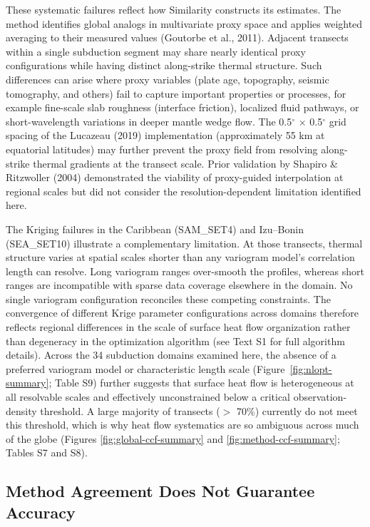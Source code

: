 \documentclass[draft,linenumbers]{agujournal2019}
\begin{document}
These systematic failures reflect how Similarity constructs its
estimates. The method identifies global analogs in multivariate proxy
space and applies weighted averaging to their measured values (Goutorbe
et al., 2011). Adjacent transects within a single subduction segment may
share nearly identical proxy configurations while having distinct
along-strike thermal structure. Such differences can arise where proxy
variables (plate age, topography, seismic tomography, and others) fail
to capture important properties or processes, for example fine-scale
slab roughness (interface friction), localized fluid pathways, or
short-wavelength variations in deeper mantle wedge flow. The
0.5\(^\circ\) \(\times\) 0.5\(^\circ\) grid spacing of the Lucazeau
(2019) implementation (approximately 55 km at equatorial latitudes) may
further prevent the proxy field from resolving along-strike thermal
gradients at the transect scale. Prior validation by Shapiro \&
Ritzwoller (2004) demonstrated the viability of proxy-guided
interpolation at regional scales but did not consider the
resolution-dependent limitation identified here.

The Kriging failures in the Caribbean (SAM\_SET4) and Izu--Bonin
(SEA\_SET10) illustrate a complementary limitation. At those transects,
thermal structure varies at spatial scales shorter than any variogram
model's correlation length can resolve. Long variogram ranges
over-smooth the profiles, whereas short ranges are incompatible with
sparse data coverage elsewhere in the domain. No single variogram
configuration reconciles these competing constraints. The convergence of
different Krige parameter configurations across domains therefore
reflects regional differences in the scale of surface heat flow
organization rather than degeneracy in the optimization algorithm (see
Text S1 for full algorithm details). Across the 34 subduction domains
examined here, the absence of a preferred variogram model or
characteristic length scale (Figure~\ref{fig:nlopt-summary}; Table S9)
further suggests that surface heat flow is heterogeneous at all
resolvable scales and effectively unconstrained below a critical
observation-density threshold. A large majority of transects (\(>\)
70\%) currently do not meet this threshold, which is why heat flow
systematics are so ambiguous across much of the globe (Figures
\ref{fig:global-ccf-summary} and \ref{fig:method-ccf-summary}; Tables S7
and S8).

\subsection{Method Agreement Does Not Guarantee
Accuracy}\label{sec:method-agreement-does-not-guarantee-accuracy}
\end{document}
